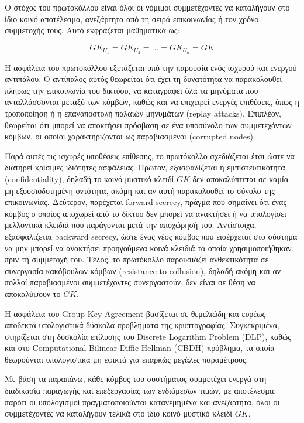 \documentclass[12pt,a4paper]{report}
\begin{document}
Ο στόχος του πρωτοκόλλου είναι όλοι οι νόμιμοι συμμετέχοντες να καταλήγουν στο ίδιο κοινό αποτέλεσμα, ανεξάρτητα από τη σειρά επικοινωνίας ή τον χρόνο συμμετοχής τους. Αυτό εκφράζεται μαθηματικά ως:

\[
GK_{U_1} = GK_{U_2} = \dots = GK_{U_n} = GK
\]

Η ασφάλεια του πρωτοκόλλου εξετάζεται υπό την παρουσία ενός ισχυρού και ενεργού αντιπάλου. Ο αντίπαλος αυτός θεωρείται ότι έχει τη δυνατότητα να παρακολουθεί πλήρως την επικοινωνία του δικτύου, να καταγράφει όλα τα μηνύματα που ανταλλάσσονται μεταξύ των κόμβων, καθώς και να επιχειρεί ενεργές επιθέσεις, όπως η τροποποίηση ή η επαναποστολή παλαιών μηνυμάτων (replay attacks). Επιπλέον, θεωρείται ότι μπορεί να αποκτήσει πρόσβαση σε ένα υποσύνολο των συμμετεχόντων κόμβων, οι οποίοι χαρακτηρίζονται ως παραβιασμένοι (corrupted nodes).

Παρά αυτές τις ισχυρές υποθέσεις επίθεσης, το πρωτόκολλο σχεδιάζεται έτσι ώστε να διατηρεί κρίσιμες ιδιότητες ασφάλειας. Πρώτον, εξασφαλίζεται η εμπιστευτικότητα (confidentiality), δηλαδή το κοινό μυστικό κλειδί $GK$ δεν αποκαλύπτεται σε καμία μη εξουσιοδοτημένη οντότητα, ακόμη και αν αυτή παρακολουθεί το σύνολο της επικοινωνίας. Δεύτερον, παρέχεται forward secrecy, πράγμα που σημαίνει ότι ένας κόμβος ο οποίος αποχωρεί από το δίκτυο δεν μπορεί να ανακτήσει ή να υπολογίσει μελλοντικά κλειδιά που παράγονται μετά την αποχώρησή του. Αντίστοιχα, εξασφαλίζεται backward secrecy, ώστε ένας νέος κόμβος που εισέρχεται στο σύστημα να μην μπορεί να ανακτήσει προηγούμενα κοινά κλειδιά τα οποία χρησιμοποιήθηκαν πριν τη συμμετοχή του. Τέλος, το πρωτόκολλο παρουσιάζει ανθεκτικότητα σε συνεργασία κακόβουλων κόμβων (resistance to collusion), δηλαδή ακόμη και αν πολλοί παραβιασμένοι συμμετέχοντες συνεργαστούν, δεν είναι σε θέση να αποκαλύψουν το $GK$.

Η ασφάλεια του Group Key Agreement βασίζεται σε θεμελιώδη και ευρέως αποδεκτά υπολογιστικά δύσκολα προβλήματα της κρυπτογραφίας. Συγκεκριμένα, στηρίζεται στη δυσκολία επίλυσης του Discrete Logarithm Problem (DLP), καθώς και στο Computational Bilinear Diffie-Hellman (CBDH) πρόβλημα, τα οποία θεωρούνται υπολογιστικά μη εφικτά για επαρκώς μεγάλες παραμέτρους.

Με βάση τα παραπάνω, κάθε κόμβος του συστήματος συμμετέχει ενεργά στη διαδικασία παραγωγής και επεξεργασίας των ενδιάμεσων τιμών, με αποτέλεσμα, παρότι οι υπολογισμοί πραγματοποιούνται κατανεμημένα και ανεξάρτητα, όλοι οι συμμετέχοντες να καταλήγουν τελικά στο ίδιο κοινό μυστικό κλειδί $GK$.
\end{document}
